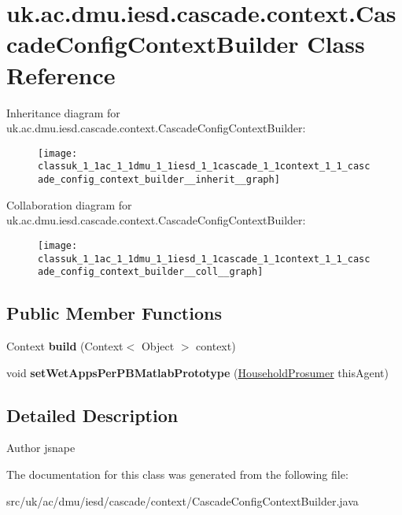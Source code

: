 \hypertarget{classuk_1_1ac_1_1dmu_1_1iesd_1_1cascade_1_1context_1_1_cascade_config_context_builder}{\section{uk.\-ac.\-dmu.\-iesd.\-cascade.\-context.\-Cascade\-Config\-Context\-Builder Class Reference}
\label{classuk_1_1ac_1_1dmu_1_1iesd_1_1cascade_1_1context_1_1_cascade_config_context_builder}
}


Inheritance diagram for uk.\-ac.\-dmu.\-iesd.\-cascade.\-context.\-Cascade\-Config\-Context\-Builder\-:\nopagebreak
\begin{figure}[H]
\begin{center}
\leavevmode
\texttt{[image: classuk\_1\_1ac\_1\_1dmu\_1\_1iesd\_1\_1cascade\_1\_1context\_1\_1\_cascade\_config\_context\_builder\_\_inherit\_\_graph]}
\end{center}
\end{figure}


Collaboration diagram for uk.\-ac.\-dmu.\-iesd.\-cascade.\-context.\-Cascade\-Config\-Context\-Builder\-:\nopagebreak
\begin{figure}[H]
\begin{center}
\leavevmode
\texttt{[image: classuk\_1\_1ac\_1\_1dmu\_1\_1iesd\_1\_1cascade\_1\_1context\_1\_1\_cascade\_config\_context\_builder\_\_coll\_\_graph]}
\end{center}
\end{figure}
\subsection*{Public Member Functions}
\begin{DoxyCompactItemize}
\item 
\hypertarget{classuk_1_1ac_1_1dmu_1_1iesd_1_1cascade_1_1context_1_1_cascade_config_context_builder_a3147d4d89fe782b9bfa32a77ea93d2ff}{Context {\bfseries build} (Context$<$ Object $>$ context)}\label{classuk_1_1ac_1_1dmu_1_1iesd_1_1cascade_1_1context_1_1_cascade_config_context_builder_a3147d4d89fe782b9bfa32a77ea93d2ff}

\item 
\hypertarget{classuk_1_1ac_1_1dmu_1_1iesd_1_1cascade_1_1context_1_1_cascade_config_context_builder_af4055c7b37a1fada353beddd2b9d62b6}{void {\bfseries set\-Wet\-Apps\-Per\-P\-B\-Matlab\-Prototype} (\hyperlink{classuk_1_1ac_1_1dmu_1_1iesd_1_1cascade_1_1agents_1_1prosumers_1_1_household_prosumer}{Household\-Prosumer} this\-Agent)}\label{classuk_1_1ac_1_1dmu_1_1iesd_1_1cascade_1_1context_1_1_cascade_config_context_builder_af4055c7b37a1fada353beddd2b9d62b6}

\end{DoxyCompactItemize}


\subsection{Detailed Description}
\begin{DoxyAuthor}{Author}
jsnape 
\end{DoxyAuthor}


The documentation for this class was generated from the following file\-:\begin{DoxyCompactItemize}
\item 
src/uk/ac/dmu/iesd/cascade/context/Cascade\-Config\-Context\-Builder.\-java\end{DoxyCompactItemize}
